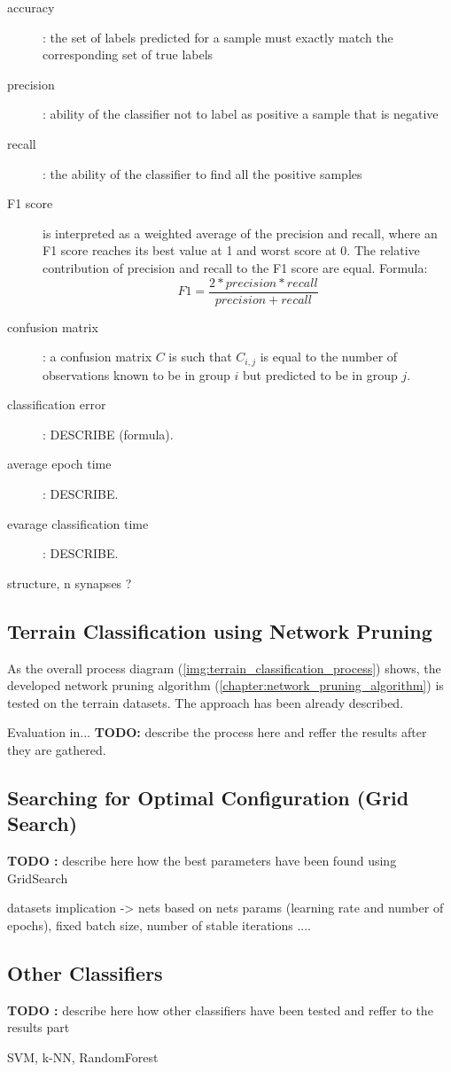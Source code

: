 \begin{description}
\item[accuracy] : the set of labels predicted for a sample must exactly match the corresponding set of true labels
\item[precision] : ability of the classifier not to label as positive a sample that is negative
\item[recall] : the ability of the classifier to find all the positive samples
\item[F1 score] is interpreted as a weighted average of the precision and recall, where an F1 score reaches its best value at 1 and worst score at 0. The relative contribution of precision and recall to the F1 score are equal. Formula:
\begin{equation} \label{eq:f1_score}
F1 = \frac{2 * precision * recall}{precision + recall}
\end{equation}
\item[confusion matrix] : a confusion matrix $ C $ is such that $ C_{i, j} $ is equal to the number of observations known to be in group $ i $ but predicted to be in group $ j $.
\item[classification error] : DESCRIBE (formula).
\item[average epoch time] : DESCRIBE.
\item[evarage classification time] : DESCRIBE.
\end{description}

structure, n synapses ?

\subsection{Terrain Classification using Network Pruning} \label{ssec:pruned_net_on_terrains}
As the overall process diagram (\cref{img:terrain_classification_process}) shows, the developed network pruning algorithm (\cref{chapter:network_pruning_algorithm}) is tested on the terrain datasets. The approach has been already described. 

Evaluation in... \textbf{TODO:} describe the process here and reffer the results after they are gathered.


\subsection{Searching for Optimal Configuration (Grid Search)} \label{ssec:grid_search}
\textbf{TODO :} describe here how the best parameters have been found using GridSearch

datasets implication -> nets based on nets params (learning rate and number of epochs), fixed batch size, number of stable iterations ....

\subsection{Other Classifiers} \label{ssec:other_classifiers}
\textbf{TODO :} describe here how other classifiers have been tested and reffer to the results part

SVM, k-NN, RandomForest